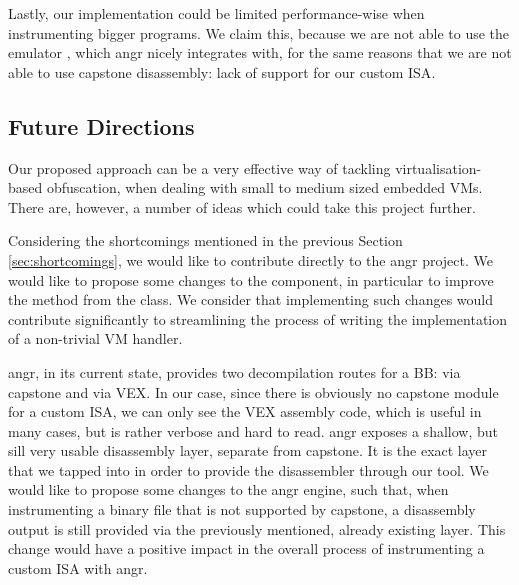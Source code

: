Lastly, our implementation could be limited performance-wise when instrumenting bigger programs. We claim this, because we are not able to use the  emulator \cite{unicorn}, which angr nicely integrates with, for the same reasons that we are not able to use capstone disassembly: lack of support for our custom \gls{ISA}.

\subsection{Future Directions}

Our proposed approach can be a very effective way of tackling virtualisation-based obfuscation, when dealing with small to medium sized embedded \glspl{VM}. There are, however, a number of ideas which could take this project further.

Considering the shortcomings mentioned in the previous Section \ref{sec:shortcomings}, we would like to contribute directly to the angr project. We would like to propose some changes to the  component, in particular to improve the  method from the  class. We consider that implementing such changes would contribute significantly to streamlining the process of writing the implementation of a non-trivial \gls{VM} handler.

angr, in its current state, provides two decompilation routes for a \gls{BB}: via capstone and via VEX. In our case, since there is obviously no capstone module for a custom \gls{ISA}, we can only see the VEX assembly code, which is useful in many cases, but is rather verbose and hard to read. angr exposes a shallow, but sill very usable disassembly layer, separate from capstone. It is the exact layer that we tapped into in order to provide the disassembler through our  tool. We would like to propose some changes to the angr engine, such that, when instrumenting a binary file that is not supported by capstone, a disassembly output is still provided via the previously mentioned, already existing layer. This change would have a positive impact in the overall process of instrumenting a custom \gls{ISA} with angr.

